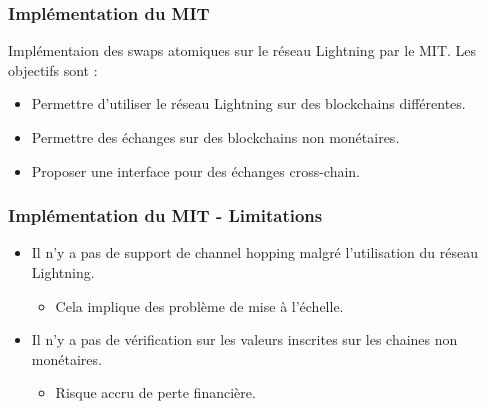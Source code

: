 \begin{frame}
	\frametitle{Implémentation du MIT}
	Implémentaion des swaps atomiques sur le réseau Lightning par le MIT. Les objectifs sont :
	\newline
	\begin{itemize}
		\item Permettre d'utiliser le réseau Lightning sur des blockchains différentes.
		\item Permettre des échanges sur des blockchains non monétaires.
		\item Proposer une interface pour des échanges cross-chain.
	\end{itemize}

\end{frame}


\begin{frame}
	\frametitle{Implémentation du MIT - Limitations}


	\begin{itemize}
		\item Il n'y a pas de support de channel hopping malgré l'utilisation du réseau Lightning.
		      \begin{itemize}
			      \item Cela implique des problème de mise à l'échelle.
		      \end{itemize}
		\item Il n'y a pas de vérification sur les valeurs inscrites sur les chaines non monétaires.
		\begin{itemize}
			\item Risque accru de perte financière.
		\end{itemize}
	\end{itemize}
\end{frame}
